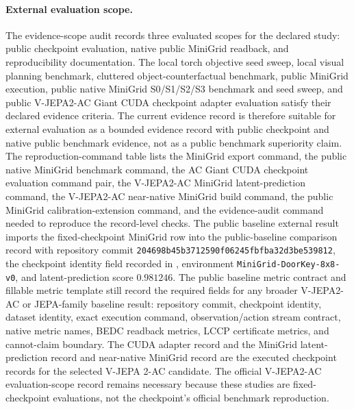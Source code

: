 \paragraph{External evaluation scope.}
The evidence-scope audit records three evaluated scopes for the declared study:
public checkpoint evaluation, native public MiniGrid readback, and
reproducibility documentation.  The local torch objective seed sweep, local
visual planning benchmark, cluttered object-counterfactual benchmark, public
MiniGrid execution, public native MiniGrid S0/S1/S2/S3 benchmark and seed
sweep, and public V-JEPA2-AC Giant CUDA checkpoint adapter evaluation satisfy
their declared evidence criteria.  The current evidence record is therefore suitable
for external evaluation as a bounded evidence record with public checkpoint and
native public benchmark evidence, not as a public benchmark superiority claim.
The reproduction-command table lists the MiniGrid export command, the
public native MiniGrid benchmark command, the AC Giant CUDA checkpoint
evaluation command pair, the V-JEPA2-AC MiniGrid latent-prediction command,
the V-JEPA2-AC near-native MiniGrid build command, the public MiniGrid
calibration-extension command, and the evidence-audit command needed to
reproduce the record-level checks.
The public baseline external result imports the fixed-checkpoint MiniGrid row
into the public-baseline comparison record with repository commit
\texttt{204698b45b3712590f06245fbfba32d3be539812}, the checkpoint identity
field recorded in
,
environment
\texttt{MiniGrid-DoorKey-8x8-v0}, and latent-prediction score $0.981246$.
The public baseline metric contract and fillable metric template still record
the required fields for any broader V-JEPA2-AC or JEPA-family baseline result:
repository commit, checkpoint identity, dataset identity, exact execution
command, observation/action stream contract, native metric names, BEDC readback
metrics, LCCP certificate metrics, and cannot-claim boundary.  The CUDA adapter record
and the MiniGrid latent-prediction record and near-native MiniGrid record are
the executed checkpoint records for the selected V-JEPA 2-AC candidate.  The
official V-JEPA2-AC evaluation-scope record remains necessary because these
studies are fixed-checkpoint evaluations, not the checkpoint's official
benchmark reproduction.

